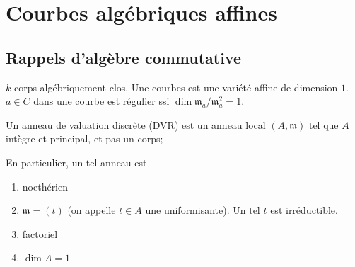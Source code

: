 \chapter{Courbes algébriques affines}
    \section{Rappels d'algèbre commutative}
        $k$ corps algébriquement clos. Une courbes est une variété affine de dimension $1$. $a \in C$ dans une courbe est régulier ssi $\dim \mathfrak{m}_a/\mathfrak{m}_a^2 = 1$.
        \begin{defi}
            Un anneau de valuation discrète (DVR) est un anneau local $(A, \mathfrak{m})$ tel que $A$ intègre et principal, et pas un corps;
        \end{defi}
        En particulier, un tel anneau est
        \begin{enumerate}
            \item noethérien
            \item $\mathfrak{m} = (t)$ (on appelle $t \in A$ une uniformisante). Un tel $t$ est irréductible.
            \item factoriel 
            \item $\dim A = 1$ \\
        \end{enumerate}
